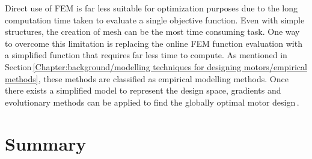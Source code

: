         
        Direct use of \acs{FEM} is far less suitable for optimization purposes due to the long computation time taken to evaluate a single objective function. Even with simple structures, the creation of mesh can be the most time consuming task. One way to overcome this limitation is replacing the online \acs{FEM} function evaluation with a simplified function that requires far less time to compute. As mentioned in Section\,\ref{Chapter:background/modelling techniques for designing motors/empirical methods}, these methods are classified as empirical modelling methods. Once there exists a simplified model to represent the design space, gradients and evolutionary methods can be applied to find the globally optimal motor design\,\cite{Ashabani2010OptimumApproach,Lee2012OptimumMethod,Giurgea2007,Hasanien2010, Hasanien2011,Zhang2017}. 

\section{Summary}                                   \label{Chapter:background/summary}

